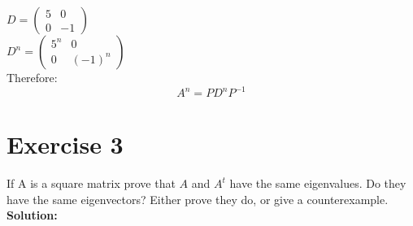 \documentclass{article}
\begin{document}
$D = \begin{pmatrix} 5 & 0 \\ 0 & -1 \end{pmatrix}$ \\

$D^n = \begin{pmatrix} 5^n & 0 \\ 0 & (-1)^n \end{pmatrix}$ \\

Therefore:
$$A^n = PD^nP^{-1}$$

\newpage

\section*{Exercise 3}
If A is a square matrix prove that $A$ and $A^t$ have the same eigenvalues. Do they have the same eigenvectors? Either prove they do, or give a counterexample. \\

\textbf{Solution:} \\
\end{document}
